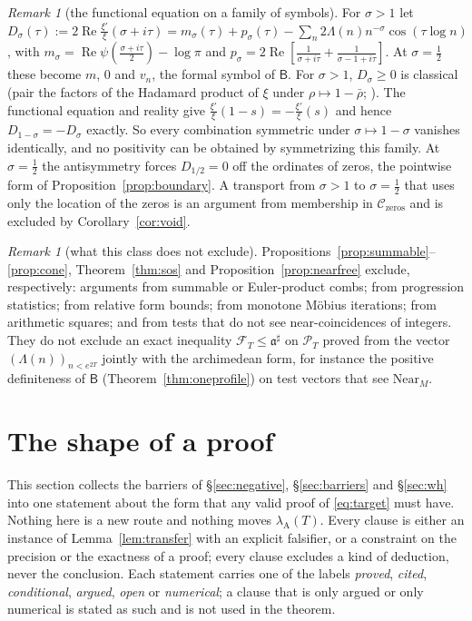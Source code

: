 \documentclass[11pt]{amsart}
\theoremstyle{definition}
\theoremstyle{remark}
\newtheorem{remark}[theorem]{Remark}
\newcommand{\Rel}{\operatorname{Re}}
\newcommand{\PT}{\mathcal P_T}
\newcommand{\lamA}{\lambda_{\mathrm A}(T)}
\begin{document}
\begin{remark}[the functional equation on a family of symbols]\label{rem:fe}
For $\sigma>1$ let $D_\sigma(\tau):=2\Rel\frac{\xi'}{\xi}(\sigma+i\tau)=m_\sigma(\tau)+p_\sigma(\tau)-\sum_n2\Lambda(n)n^{-\sigma}\cos(\tau\log n)$, with
$m_\sigma=\Rel\psi(\frac{\sigma+i\tau}2)-\log\pi$ and $p_\sigma=2\Rel[\frac1{\sigma+i\tau}+\frac1{\sigma-1+i\tau}]$. At $\sigma=\frac12$ these become $m$, $0$
and $v_n$, the formal symbol of $\mathsf B$. For $\sigma>1$, $D_\sigma\ge0$ is classical (pair the factors of the Hadamard product of $\xi$
under $\rho\mapsto1-\bar\rho$; \cite[Ch.~12]{Davenport2000}). The functional equation and reality give
$\frac{\xi'}{\xi}(1-s)=-\frac{\xi'}{\xi}(s)$ and hence $D_{1-\sigma}=-D_\sigma$ exactly. So every combination symmetric under $\sigma\mapsto1-\sigma$
vanishes identically, and no positivity can be obtained by symmetrizing this family. At $\sigma=\frac12$ the antisymmetry forces
$D_{1/2}=0$ off the ordinates of zeros, the pointwise form of Proposition~\ref{prop:boundary}. A transport from $\sigma>1$ to
$\sigma=\frac12$ that uses only the location of the zeros is an argument from membership in $\mathcal C_{\mathrm{zeros}}$ and is
excluded by Corollary~\ref{cor:void}.
\end{remark}

\begin{remark}[what this class does not exclude]\label{rem:bar-arith}
Propositions~\ref{prop:summable}--\ref{prop:cone}, Theorem~\ref{thm:sos} and Proposition~\ref{prop:nearfree} exclude, respectively:
arguments from summable or Euler-product combs; from progression statistics; from relative form bounds; from monotone M\"obius
iterations; from arithmetic squares; and from tests that do not see near-coincidences of integers. They do not exclude an exact
inequality $\mathcal F_T\le\mathfrak a^\sharp$ on $\PT$ proved from the vector $(\Lambda(n))_{n<e^{2T}}$ jointly with the archimedean form,
for instance the positive definiteness of $\mathsf B$ (Theorem~\ref{thm:oneprofile}) on test vectors that see $\mathrm{Near}_M$.
\end{remark}


\section{The shape of a proof}\label{sec:shape}

This section collects the barriers of \S\ref{sec:negative}, \S\ref{sec:barriers} and \S\ref{sec:wh} into one statement about
the form that any valid proof of \eqref{eq:target} must have. Nothing here is a new route and nothing moves $\lamA$. Every
clause is either an instance of Lemma~\ref{lem:transfer} with an explicit falsifier, or a constraint on the precision or the
exactness of a proof; every clause excludes a kind of deduction, never the conclusion. Each statement carries one of the labels
\emph{proved}, \emph{cited}, \emph{conditional}, \emph{argued}, \emph{open} or \emph{numerical}; a clause that is only argued or
only numerical is stated as such and is not used in the theorem.
\end{document}

